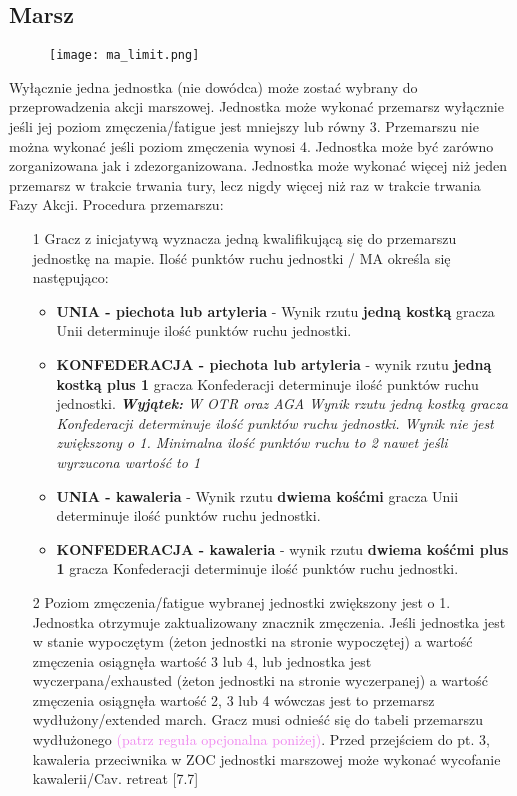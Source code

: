 \subsection{Marsz}
\begin{wrapfigure}{l}{0.1\textwidth}
    \texttt{[image: ma\_limit.png]}
\end{wrapfigure}
Wyłącznie jedna jednostka (nie dowódca) może zostać wybrany do przeprowadzenia akcji marszowej. Jednostka może wykonać przemarsz wyłącznie jeśli jej poziom
zmęczenia/fatigue jest mniejszy lub równy 3. Przemarszu nie można wykonać jeśli poziom zmęczenia wynosi 4. Jednostka może być zarówno zorganizowana jak i zdezorganizowana. Jednostka może wykonać więcej niż jeden przemarsz w trakcie trwania tury, lecz nigdy więcej niż raz w trakcie trwania Fazy Akcji. Procedura przemarszu:
\begin{itemize}
	\item[1] Gracz z inicjatywą wyznacza jedną kwalifikującą się do przemarszu jednostkę na mapie. Ilość punktów ruchu jednostki / MA określa się następująco:
	\begin{itemize}
		\item \textbf{UNIA - piechota lub artyleria} - Wynik rzutu \textbf{jedną kostką} gracza Unii determinuje ilość punktów ruchu jednostki. 
		\item \textbf{KONFEDERACJA - piechota lub artyleria} - wynik rzutu \textbf{jedną kostką plus 1} gracza Konfederacji determinuje ilość punktów ruchu jednostki. \textit{\textbf{Wyjątek:} W OTR oraz AGA Wynik rzutu jedną kostką gracza Konfederacji determinuje ilość punktów ruchu jednostki. Wynik nie jest zwiększony o 1. Minimalna ilość punktów ruchu to 2 nawet jeśli wyrzucona wartość to 1}
		\item \textbf{UNIA - kawaleria} - Wynik rzutu \textbf{dwiema kośćmi} gracza Unii determinuje ilość punktów ruchu jednostki. 
		\item \textbf{KONFEDERACJA - kawaleria} - wynik rzutu \textbf{dwiema kośćmi plus 1} gracza Konfederacji determinuje ilość punktów ruchu jednostki.
	\end{itemize}
	\item[2] Poziom zmęczenia/fatigue wybranej jednostki zwiększony jest o 1. Jednostka otrzymuje zaktualizowany znacznik zmęczenia.
	Jeśli jednostka jest w stanie wypoczętym (żeton jednostki na stronie wypoczętej) a wartość zmęczenia osiągnęła wartość 3 lub 4, lub jednostka jest wyczerpana/exhausted (żeton jednostki na stronie wyczerpanej) a wartość zmęczenia osiągnęła wartość 2, 3 lub 4 wówczas jest to przemarsz wydłużony/extended march. Gracz musi odnieść się do tabeli przemarszu wydłużonego \textcolor{violet}{(patrz reguła opcjonalna poniżej)}. Przed przejściem do pt. 3, kawaleria przeciwnika w ZOC jednostki marszowej może wykonać wycofanie kawalerii/Cav. retreat [7.7]

\end{itemize}
